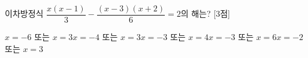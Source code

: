 이차방정식 $\dfrac{x(x-1)}{3}-\dfrac{(x-3)(x+2)}{6}=2$의 해는? \mbox{[3점]}
\begin{choicesii}{$x=-6$ 또는 $x=3$}{$x=-4$ 또는 $x=3$}{$x=-3$ 또는 $x=4$}{$x=-3$ 또는 $x=6$}{$x=-2$ 또는 $x=3$}\end{choicesii}
